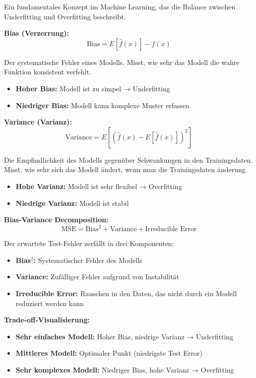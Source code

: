 Ein fundamentales Konzept im Machine Learning, das die Balance zwischen Underfitting und Overfitting beschreibt.

\textbf{Bias (Verzerrung):}
$$\text{Bias} = E[\hat{f}(x)] - f(x)$$

Der systematische Fehler eines Modells. Misst, wie sehr das Modell die wahre Funktion konsistent verfehlt.
\begin{itemize}[leftmargin=1.5em]
    \item \textbf{Hoher Bias:} Modell ist zu simpel → Underfitting
    \item \textbf{Niedriger Bias:} Modell kann komplexe Muster erfassen
\end{itemize}

\textbf{Variance (Varianz):}
$$\text{Variance} = E[(\hat{f}(x) - E[\hat{f}(x)])^2]$$

Die Empfindlichkeit des Modells gegenüber Schwankungen in den Trainingsdaten. Misst, wie sehr sich das Modell ändert, wenn man die Trainingsdaten änderung.
\begin{itemize}[leftmargin=1.5em]
    \item \textbf{Hohe Varianz:} Modell ist sehr flexibel → Overfitting
    \item \textbf{Niedrige Varianz:} Modell ist stabil
\end{itemize}

\textbf{Bias-Variance Decomposition:}
$$\text{MSE} = \text{Bias}^2 + \text{Variance} + \text{Irreducible Error}$$

Der erwartete Test-Fehler zerfällt in drei Komponenten:
\begin{itemize}[leftmargin=1.5em]
    \item \textbf{Bias$^2$:} Systematischer Fehler des Modells
    \item \textbf{Variance:} Zufälliger Fehler aufgrund von Instabilität
    \item \textbf{Irreducible Error:} Rauschen in den Daten, das nicht durch ein Modell reduziert werden kann
\end{itemize}

\textbf{Trade-off-Visualisierung:}
\begin{itemize}[leftmargin=1.5em]
    \item \textbf{Sehr einfaches Modell:} Hoher Bias, niedrige Varianz → Underfitting
    \item \textbf{Mittleres Modell:} Optimaler Punkt (niedrigste Test Error)
    \item \textbf{Sehr komplexes Modell:} Niedriger Bias, hohe Varianz → Overfitting
\end{itemize}

